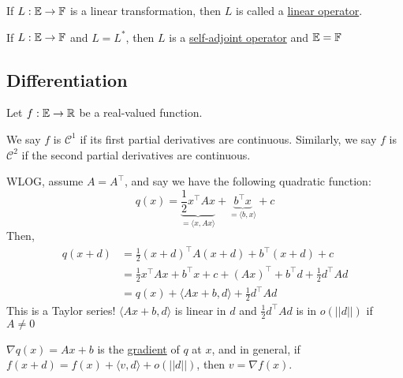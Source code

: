 \begin{definition}
    If $L: \mathbb{E} \rightarrow \mathbb{F}$ is a linear transformation, then $L$ is called a \underline{linear operator}.
\end{definition}

\begin{definition}
    If $L: \mathbb{E} \rightarrow \mathbb{F}$ and $L = L^*$, then $L$ is a \underline{self-adjoint operator} and $\mathbb{E} = \mathbb{F}$
\end{definition}

\subsection{Differentiation}
Let $f: \mathbb{E} \rightarrow \mathbb{R}$ be a real-valued function.

We say $f$ is $\mathcal{C}^1$ if its first partial derivatives are continuous.
Similarly, we say $f$ is $\mathcal{C}^2$ if the second partial derivatives are continuous.

WLOG, assume $A = A^\intercal$, and say we have the following quadratic function:
\begin{equation*}
    q(x) = 
    \underbrace{\frac{1}{2}x^\intercal A x}_{= \langle x, Ax \rangle} +
    \underbrace{b^\intercal x}_{= \langle b, x \rangle} +
    c 
\end{equation*}
Then,
\begin{align*}
    q(x + d) &= \frac{1}{2}(x + d)^\intercal A (x + d) + b^\intercal (x + d) + c \\
    &= \frac{1}{2}x^\intercal A x + b^\intercal x + c + (Ax)^\intercal + b^\intercal d + \frac{1}{2} d^\intercal A d \\
    &= q(x) + \langle Ax + b, d \rangle + \frac{1}{2}d^\intercal A d
\end{align*}
This is a Taylor series! $\langle Ax + b, d \rangle$ is linear in $d$ and $\frac{1}{2}d^\intercal A d$ is in $o(||d||)$ if $A \neq 0$

$\nabla q(x) = Ax + b$ is the \underline{gradient} of $q$ at $x$, and in general, if $f(x + d) = f(x) + \langle v, d \rangle + o(||d||)$, then $v = \nabla f(x)$.

